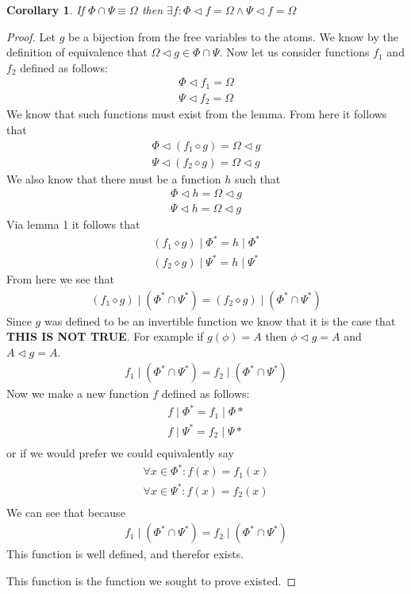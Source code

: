 \documentclass{article}
\newtheorem*{cor}{Corollary}
\begin{document}
\begin{cor}
If $\Phi \cap \Psi \equiv \Omega$ then $\exists f: \Phi \lhd f = \Omega \land \Psi \lhd f = \Omega$
\end{cor}
\begin{proof}
Let $g$ be a bijection from the free variables to the atoms.
We know by the definition of equivalence that $\Omega \lhd g \in \Phi \cap \Psi$.
Now let us consider functions $f_1$ and $f_2$ defined as follows:
\begin{align*}
\Phi \lhd f_1 = \Omega \\
\Psi \lhd f_2 = \Omega
\end{align*}
We know that such functions must exist from the lemma.
From here it follows that
\begin{align*}
\Phi \lhd (f_1 \diamond g) = \Omega \lhd g \\
\Psi \lhd (f_2 \diamond g) = \Omega \lhd g
\end{align*}
We also know that there must be a function $h$ such that
\begin{align*}
\Phi \lhd h = \Omega \lhd g \\
\Psi \lhd h = \Omega \lhd g
\end{align*}
Via lemma 1 it follows that
\begin{align*}
(f_1 \diamond g) \mid \Phi^* = h \mid \Phi^* \\
(f_2 \diamond g) \mid \Psi^* = h \mid \Psi^*
\end{align*}
From here we see that
\begin{align*}
(f_1 \diamond g) \mid (\Phi^* \cap \Psi^*) = (f_2 \diamond g) \mid (\Phi^* \cap \Psi^*)
\end{align*}
Since $g$ was defined to be an invertible function we know that it is the case that
\textbf{THIS IS NOT TRUE}. For example if $g(\phi) = A$ then $\phi \lhd g = A$ and $A \lhd g = A$.
\begin{align*}
f_1 \mid (\Phi^* \cap \Psi^*) = f_2 \mid (\Phi^* \cap \Psi^*)
\end{align*}
Now we make a new function $f$ defined as follows:
\begin{align*}
f \mid \Phi^* = f_1 \mid \Phi* \\
f \mid \Psi^* = f_2 \mid \Psi* \\
\end{align*}
or if we would prefer we could equivalently say
\begin{align*}
\forall x \in \Phi^* : f (x) = f_1 (x) \\
\forall x \in \Psi^* : f (x) = f_2 (x) \\
\end{align*}
We can see that because
\begin{align*}
f_1 \mid (\Phi^* \cap \Psi^*) = f_2 \mid (\Phi^* \cap \Psi^*)
\end{align*}
This function is well defined, and therefor exists.

This function is the function we sought to prove existed.
\end{proof}
\end{document}
